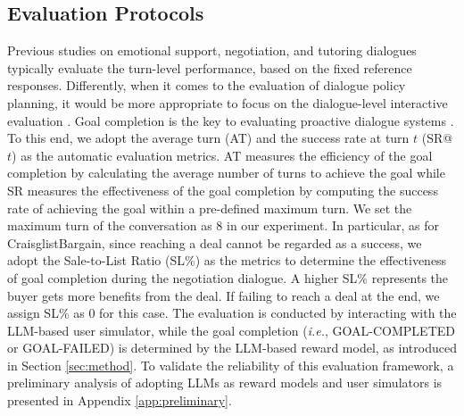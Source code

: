 \documentclass{article} %
\begin{document}
\subsection{Evaluation Protocols}
Previous studies \citep{iclr21-negotiate-strategy,emnlp22-esc,eacl23-strategy-tutor} on emotional support, negotiation, and tutoring dialogues typically evaluate the turn-level performance, based on the fixed reference responses. 
Differently, when it comes to the evaluation of dialogue policy planning, it would be more appropriate to focus on the dialogue-level interactive evaluation \citep{survey-dpl,crs-survey}. 
Goal completion is the key to evaluating proactive dialogue systems \citep{proactive-survey}. 
To this end, we adopt the average turn (AT) and the success rate at turn $t$ (SR@$t$) as the automatic evaluation metrics. AT measures the efficiency of the goal completion by calculating the average number of turns to achieve the goal while SR measures the effectiveness of the goal completion by computing the success rate of achieving the goal within a pre-defined maximum turn. 
We set the maximum turn of the conversation as 8 in our experiment. 
In particular, as for CraisglistBargain, since reaching a deal cannot be regarded as a success, we adopt the Sale-to-List Ratio (SL\%) \citep{sigdial19-negotiate} as the metrics to determine the effectiveness of goal completion during the negotiation dialogue. A higher SL\% represents the buyer gets more benefits from the deal. If failing to reach a deal at the end, we assign SL\% as 0 for this case. 
The evaluation is conducted by interacting with the LLM-based user simulator, while the goal completion (\textit{i.e.}, GOAL-COMPLETED or GOAL-FAILED) is determined by the LLM-based reward model, as introduced in Section \ref{sec:method}. 
To validate the reliability of this evaluation framework, a preliminary analysis of adopting LLMs as reward models and user simulators is presented in Appendix \ref{app:preliminary}. 
\end{document}
